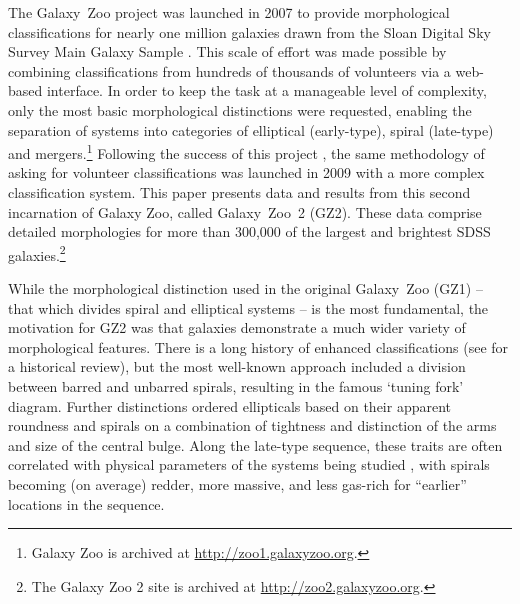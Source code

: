 \documentclass[useAMS,usenatbib]{mn2e}
\begin{document}
The Galaxy~Zoo project \citep{lin08} was launched in 2007 to provide morphological classifications for nearly one million galaxies drawn from the Sloan Digital Sky Survey \citep[SDSS;][]{yor00} Main Galaxy Sample \citep{str02}. This scale of effort was made possible by combining classifications from hundreds of thousands of volunteers via a web-based interface. In order to keep the task at a manageable level of complexity, only the most basic morphological distinctions were requested, enabling the separation of systems into categories of elliptical (early-type), spiral (late-type) and mergers.\footnote{Galaxy Zoo is archived at \url{http://zoo1.galaxyzoo.org}.} Following the success of this project \citep{lin08,lin11}, the same methodology of asking for volunteer classifications was launched in 2009 with a more complex classification system. This paper presents data and results from this second incarnation of Galaxy Zoo, called Galaxy~Zoo~2 (GZ2). These data comprise detailed morphologies for more than 300,000 of the largest and brightest SDSS galaxies.\footnote{The Galaxy Zoo 2 site is archived at \url{http://zoo2.galaxyzoo.org}.}

While the morphological distinction used in the original Galaxy~Zoo (GZ1) -- that which divides spiral and elliptical systems -- is the most fundamental, the motivation for GZ2 was that galaxies demonstrate a much wider variety of morphological features. There is a long history of enhanced classifications (see \citealt{but13} for a historical review), but the most well-known approach \citep{hub26} included a division between barred and unbarred spirals, resulting in the famous `tuning fork' diagram. Further distinctions ordered ellipticals based on their apparent roundness and spirals on a combination of tightness and distinction of the arms and size of the central bulge. Along the late-type sequence, these traits are often correlated with physical parameters of the systems being studied \citep{rob94}, with spirals becoming (on average) redder, more massive, and less gas-rich for ``earlier'' locations in the sequence.
\end{document}
